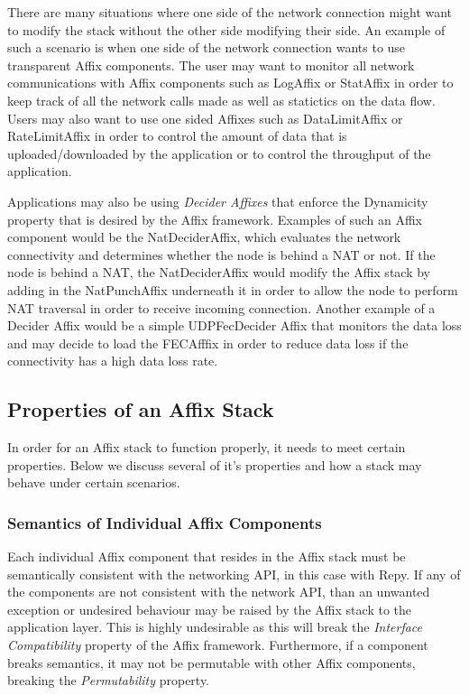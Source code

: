 There are many situations where one side of the network connection might want to 
modify the stack without the other side modifying their side. An example of such
a scenario is when one side of the network connection wants to use transparent 
Affix components. The user may want to monitor all network communications with
Affix components such as LogAffix or StatAffix in order to keep track of all 
the network calls made as well as statictics on the data flow. Users may also
want to use one sided Affixes such as DataLimitAffix or RateLimitAffix in order
to control the amount of data that is uploaded/downloaded by the application or
to control the throughput of the application.

Applications may also be using \textit{Decider Affixes} that enforce the Dynamicity
property that is desired by the Affix framework. Examples of such an Affix component
would be the NatDeciderAffix, which evaluates the network connectivity and determines
whether the node is behind a NAT or not. If the node is behind a NAT, the NatDeciderAffix
would modify the Affix stack by adding in the NatPunchAffix underneath it in order
to allow the node to perform NAT traversal in order to receive incoming connection.
Another example of a Decider Affix would be a simple UDPFecDecider Affix that monitors
the data loss and may decide to load the FECAfffix in order to reduce data loss if 
the connectivity has a high data loss rate.

\subsection{Properties of an Affix Stack}

In order for an Affix stack to function properly, it needs to meet certain properties.
Below we discuss several of it's properties and how a stack may behave under certain
scenarios.

\subsubsection{Semantics of Individual Affix Components}

Each individual Affix component that resides in the Affix stack must be semantically
consistent with the networking API, in this case with Repy. If any of the components
are not consistent with the network API, than an unwanted exception or undesired behaviour
may be raised by the Affix stack to the application layer. This is highly undesirable
as this will break the \textit{Interface Compatibility} property of the Affix framework.
Furthermore, if a component breaks semantics, it may not be permutable with other Affix
components, breaking the \textit{Permutability} property. 


